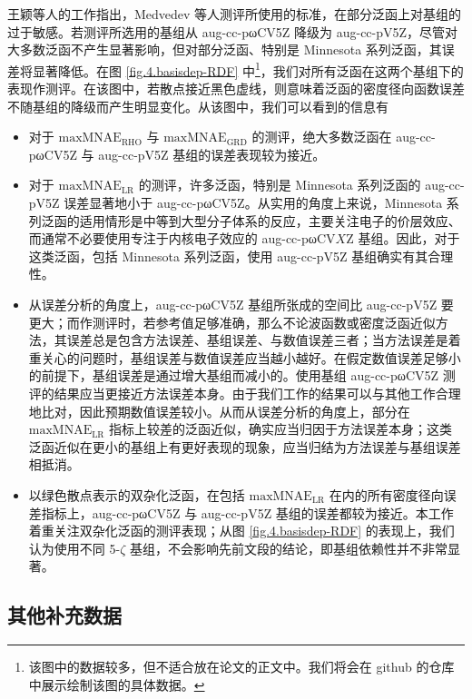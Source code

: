 王颖等人\cite{Wang-He.JCTC.2017}的工作指出，Medvedev 等人\cite{Medvedev-Lyssenko.S.2017}测评所使用的标准，在部分泛函上对基组的过于敏感。若测评所选用的基组从 aug-cc-pωCV5Z 降级为 aug-cc-pV5Z，尽管对大多数泛函不产生显著影响，但对部分泛函、特别是 Minnesota 系列泛函，其误差将显著降低。在图 \ref{fig.4.basisdep-RDF} 中\footnote{该图中的数据较多，但不适合放在论文的正文中。\alert{我们将会在 github 的仓库中展示绘制该图的具体数据。}}，我们对所有泛函在这两个基组下的表现作测评。在该图中，若散点接近黑色虚线，则意味着泛函的密度径向函数误差不随基组的降级而产生明显变化。从该图中，我们可以看到的信息有
\begin{itemize}[nosep]
    \item 对于 $\text{maxMNAE}_\text{RHO}$ 与 $\text{maxMNAE}_\text{GRD}$ 的测评，绝大多数泛函在 aug-cc-pωCV5Z 与 aug-cc-pV5Z 基组的误差表现较为接近。
    \item 对于 $\text{maxMNAE}_\text{LR}$ 的测评，许多泛函，特别是 Minnesota 系列泛函的 aug-cc-pV5Z 误差显著地小于 aug-cc-pωCV5Z。从实用的角度上来说，Minnesota 系列泛函的适用情形是中等到大型分子体系的反应，主要关注电子的价层效应、而通常不必要使用专注于内核电子效应的 aug-cc-pωCV$X$Z 基组。因此，对于这类泛函，包括 Minnesota 系列泛函，使用 aug-cc-pV5Z 基组确实有其合理性。
    \item 从误差分析的角度上，aug-cc-pωCV5Z 基组所张成的空间比 aug-cc-pV5Z 要更大；而作测评时，若参考值足够准确，那么不论波函数或密度泛函近似方法，其误差总是包含方法误差、基组误差、与数值误差三者；当方法误差是着重关心的问题时，基组误差与数值误差应当越小越好。在假定数值误差足够小的前提下，基组误差是通过增大基组而减小的。使用基组 aug-cc-pωCV5Z 测评的结果应当更接近方法误差本身。由于我们工作的结果可以与其他工作合理地比对\cite{Medvedev-Lyssenko.S.2017, Kepp-Kepp.S.2017, Wang-He.JCTC.2017}，因此预期数值误差较小。从而从误差分析的角度上，部分在 $\text{maxMNAE}_\text{LR}$ 指标上较差的泛函近似，确实应当归因于方法误差本身；这类泛函近似在更小的基组上有更好表现的现象，应当归结为方法误差与基组误差相抵消。
    \item 以绿色散点表示的双杂化泛函，在包括 $\text{maxMNAE}_\text{LR}$ 在内的所有密度径向误差指标上，aug-cc-pωCV5Z 与 aug-cc-pV5Z 基组的误差都较为接近。本工作着重关注双杂化泛函的测评表现；从图 \ref{fig.4.basisdep-RDF} 的表现上，我们认为使用不同 5-$\zeta$ 基组，不会影响先前文段的结论，即基组依赖性并不非常显著。
\end{itemize}

\subsection{其他补充数据}

